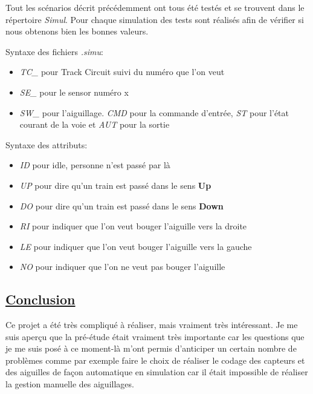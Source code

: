 \bigskip

Tout les scénarios décrit précédemment ont tous été testés et se trouvent
dans le répertoire \emph{Simul}.
Pour chaque simulation des tests sont réalisés afin de vérifier si nous
obtenons bien les bonnes valeurs.

\medskip

Syntaxe des fichiers \emph{.simu}:

\begin{itemize}
  \item \emph{TC\_} pour Track Circuit suivi du numéro que l'on veut
  \item \emph{SE\_} pour le sensor numéro x
  \item \emph{SW\_} pour l'aiguillage. \emph{CMD} pour la commande d'entrée, \emph{ST} pour
    l'état courant de la voie et \emph{AUT} pour la sortie
\end{itemize}

\medskip

Syntaxe des attributs:

\begin{itemize}
  \item \emph{ID} pour idle, personne n'est passé par là
  \item \emph{UP} pour dire qu'un train est passé dans le sens \textbf{Up}
  \item \emph{DO} pour dire qu'un train est passé dans le sens \textbf{Down}    
  \item \emph{RI} pour indiquer que l'on veut bouger l'aiguille vers la
    droite
  \item \emph{LE} pour indiquer que l'on veut bouger l'aiguille vers la
    gauche
  \item \emph{NO} pour indiquer que l'on ne veut pas bouger l'aiguille       
\end{itemize}

\newpage

\subsection{\underline{Conclusion}}
\label{sec:Conclusion}

\bigskip

Ce projet a été très compliqué à réaliser, mais vraiment très
intéressant.
Je me  suis aperçu que la pré-étude était vraiment très
importante car les questions que je me suis posé à ce moment-là
m'ont permis d'anticiper un certain nombre de  problèmes comme par
exemple faire le choix de réaliser le codage des capteurs et des
aiguilles de façon automatique en simulation car il était impossible
de réaliser la gestion manuelle des aiguillages.

